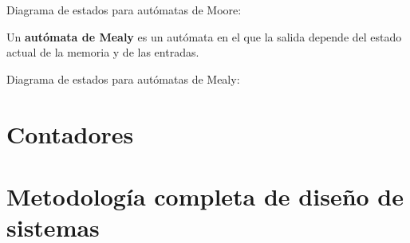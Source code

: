 \documentclass[a4paper]{book}
\begin{document}
Diagrama de estados para autómatas de Moore:

Un \textbf{autómata de Mealy} es un autómata en el que la salida depende del estado actual de la memoria y de las entradas.

Diagrama de estados para autómatas de Mealy:

\section{Contadores}
\section{Metodología completa de diseño de sistemas}




%
% 
\end{document}
